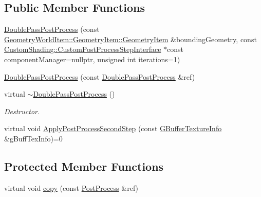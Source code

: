 \subsection*{Public Member Functions}
\begin{DoxyCompactItemize}
\item 
\mbox{\hyperlink{class_geometry_engine_1_1_geometry_post_process_1_1_double_pass_post_process_1_1_double_pass_post_process_a907023905b18f434bdf0bc2fb918591d}{Double\+Pass\+Post\+Process}} (const \mbox{\hyperlink{class_geometry_engine_1_1_geometry_world_item_1_1_geometry_item_1_1_geometry_item}{Geometry\+World\+Item\+::\+Geometry\+Item\+::\+Geometry\+Item}} \&bounding\+Geometry, const \mbox{\hyperlink{class_geometry_engine_1_1_custom_shading_1_1_custom_post_process_step_interface}{Custom\+Shading\+::\+Custom\+Post\+Process\+Step\+Interface}} $\ast$const component\+Manager=nullptr, unsigned int iterations=1)
\item 
\mbox{\hyperlink{class_geometry_engine_1_1_geometry_post_process_1_1_double_pass_post_process_1_1_double_pass_post_process_acf262889c6fddc54ee4daf2015c2a69f}{Double\+Pass\+Post\+Process}} (const \mbox{\hyperlink{class_geometry_engine_1_1_geometry_post_process_1_1_double_pass_post_process_1_1_double_pass_post_process}{Double\+Pass\+Post\+Process}} \&ref)
\item 
\mbox{\label{class_geometry_engine_1_1_geometry_post_process_1_1_double_pass_post_process_1_1_double_pass_post_process_ae50b64dabbe90930bffb4976785021ed}} 
virtual \mbox{\hyperlink{class_geometry_engine_1_1_geometry_post_process_1_1_double_pass_post_process_1_1_double_pass_post_process_ae50b64dabbe90930bffb4976785021ed}{$\sim$\+Double\+Pass\+Post\+Process}} ()
\begin{DoxyCompactList}\small\item\em Destructor. \end{DoxyCompactList}\item 
virtual void \mbox{\hyperlink{class_geometry_engine_1_1_geometry_post_process_1_1_double_pass_post_process_1_1_double_pass_post_process_a2818082bfbcbacf9ccb0e1b2059c24e8}{Apply\+Post\+Process\+Second\+Step}} (const \mbox{\hyperlink{class_geometry_engine_1_1_g_buffer_texture_info}{G\+Buffer\+Texture\+Info}} \&g\+Buff\+Tex\+Info)=0
\end{DoxyCompactItemize}
\subsection*{Protected Member Functions}
\begin{DoxyCompactItemize}
\item 
virtual void \mbox{\hyperlink{class_geometry_engine_1_1_geometry_post_process_1_1_double_pass_post_process_1_1_double_pass_post_process_a28b760437951a4676b55efb491358e8f}{copy}} (const \mbox{\hyperlink{class_geometry_engine_1_1_geometry_post_process_1_1_post_process}{Post\+Process}} \&ref)
\end{DoxyCompactItemize}
